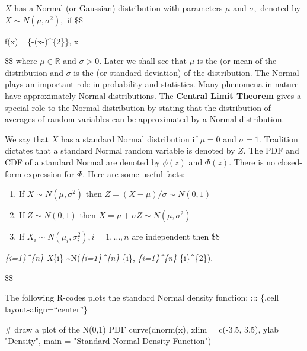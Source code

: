 \documentclass[
  letterpaper,
  DIV=11,
  numbers=noendperiod]{scrreprt}
\newenvironment{Shaded}{\begin{snugshade}}{\end{snugshade}}
\newcommand{\AttributeTok}[1]{\textcolor[rgb]{0.40,0.45,0.13}{#1}}
\newcommand{\CommentTok}[1]{\textcolor[rgb]{0.37,0.37,0.37}{#1}}
\newcommand{\FloatTok}[1]{\textcolor[rgb]{0.68,0.00,0.00}{#1}}
\newcommand{\FunctionTok}[1]{\textcolor[rgb]{0.28,0.35,0.67}{#1}}
\newcommand{\NormalTok}[1]{\textcolor[rgb]{0.00,0.23,0.31}{#1}}
\newcommand{\SpecialCharTok}[1]{\textcolor[rgb]{0.37,0.37,0.37}{#1}}
\newcommand{\StringTok}[1]{\textcolor[rgb]{0.13,0.47,0.30}{#1}}
\theoremstyle{definition}
\theoremstyle{plain}
\theoremstyle{plain}
\theoremstyle{remark}
\begin{document}
\(X\) has a Normal (or Gaussian) distribution with parameters \(\mu\)
and \(\sigma,\) denoted by \(X \sim N\left(\mu, \sigma^{2}\right),\) if
\$\$

f(x)=
\exp \left\{-(x-\mu)\^{}\{2\}\right\}, \quad x
\in {}

\$\$ where \(\mu \in \mathbb{R}\) and \(\sigma>0.\) Later we shall see
that \(\mu\) is the  (or mean of the distribution and
\(\sigma\) is the  (or standard deviation) of the
distribution. The Normal plays an important role in probability and
statistics. Many phenomena in nature have approximately Normal
distributions. The \textbf{Central Limit Theorem} gives a special role
to the Normal distribution by stating that the distribution of averages
of random variables can be approximated by a Normal distribution.

We say that \(X\) has a standard Normal distribution if \(\mu=0\) and
\(\sigma=1\). Tradition dictates that a standard Normal random variable
is denoted by \(Z\). The PDF and CDF of a standard Normal are denoted by
\(\phi(z)\) and \(\Phi(z)\). There is no closed-form expression for
\(\Phi\). Here are some useful facts:

\begin{enumerate}
\def\labelenumi{(\roman{enumi})}
\item
  If \(X \sim N\left(\mu, \sigma^{2}\right)\) then
  \(Z=(X-\mu) / \sigma \sim N(0,1)\)
\item
  If \(Z \sim N(0,1)\) then
  \(X=\mu+\sigma Z \sim N\left(\mu, \sigma^{2}\right)\)
\item
  If
  \(X_{i} \sim N\left(\mu_{i}, \sigma_{i}^{2}\right), i=1, \ldots, n\)
  are independent then \$\$
\end{enumerate}

\sum\emph{\{i=1\}\^{}\{n\} X}\{i\}
\sim N\left(\sum\emph{\{i=1\}\^{}\{n\} \mu}\{i\},
\sum\emph{\{i=1\}\^{}\{n\} \sigma}\{i\}\^{}\{2\}\right).

\$\$

The following \textsf{R}-codes plots the standard Normal density
function: ::: \{.cell layout-align=``center''\}

\begin{Shaded}
\begin{Highlighting}[]
\CommentTok{\# draw a plot of the N(0,1) PDF}
\FunctionTok{curve}\NormalTok{(}\FunctionTok{dnorm}\NormalTok{(x),}
      \AttributeTok{xlim =} \FunctionTok{c}\NormalTok{(}\SpecialCharTok{{-}}\FloatTok{3.5}\NormalTok{, }\FloatTok{3.5}\NormalTok{),}
      \AttributeTok{ylab =} \StringTok{"Density"}\NormalTok{, }
      \AttributeTok{main =} \StringTok{"Standard Normal Density Function"}\NormalTok{) }
\end{Highlighting}
\end{Shaded}
\end{document}
